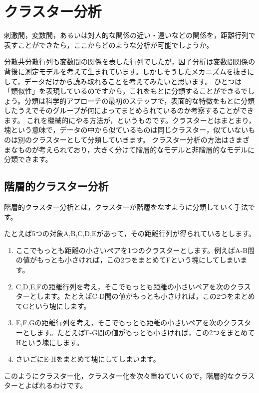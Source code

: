 \documentclass{ltjsbook}
\begin{document}
\section{クラスター分析}
刺激間，変数間，あるいは対人的な関係の近い・遠いなどの関係を，距離行列で表すことができたら，ここからどのような分析が可能でしょうか。

分散共分散行列も変数間の関係を表した行列でしたが，因子分析は変数間関係の背後に測定モデルを考えて生まれています。しかしそうしたメカニズムを抜きにして，データだけから読み取れることを考えてみたいと思います。
ひとつは「類似性」を表現しているのですから，これをもとに分類することができるでしょう。分類は科学的アプローチの最初のステップで，表面的な特徴をもとに分類したうえでそのグループが何によってまとめられているのか考察することができます。
これを機械的にやる方法が，というものです。クラスターとはまとまり，塊という意味で，データの中から似ているものは同じクラスター，似ていないものは別のクラスターとして分類していきます。
クラスター分析の方法はさまざまなものが考えられており，大きく分けて階層的なモデルと非階層的なモデルに分類できます。
\subsection{階層的クラスター分析}
階層的クラスター分析とは，クラスターが階層をなすように分類していく手法です。

たとえば5つの対象A,B,C,D,Eがあって，その距離行列が得られているとします。
\begin{enumerate}
	\item ここでもっとも距離の小さいペアを1つのクラスターとします。例えばA-B間の値がもっとも小さければ，この2つをまとめてFという塊にしてしまいます。
	\item C,D,E,Fの距離行列を考え，そこでもっとも距離の小さいペアを次のクラスターとします。たとえばC-D間の値がもっとも小さければ，この2つをまとめてGという塊にします。
	\item E,F,Gの距離行列を考え，そこでもっとも距離の小さいペアを次のクラスターとします。たとえばF-G間の値がもっとも小さければ，この2つをまとめてHという塊にします。
	\item さいごにE-Hをまとめて塊にしてしまいます。
\end{enumerate}
このようにクラスター化，クラスター化を次々重ねていくので，階層的なクラスターとよばれるわけです。
\end{document}
